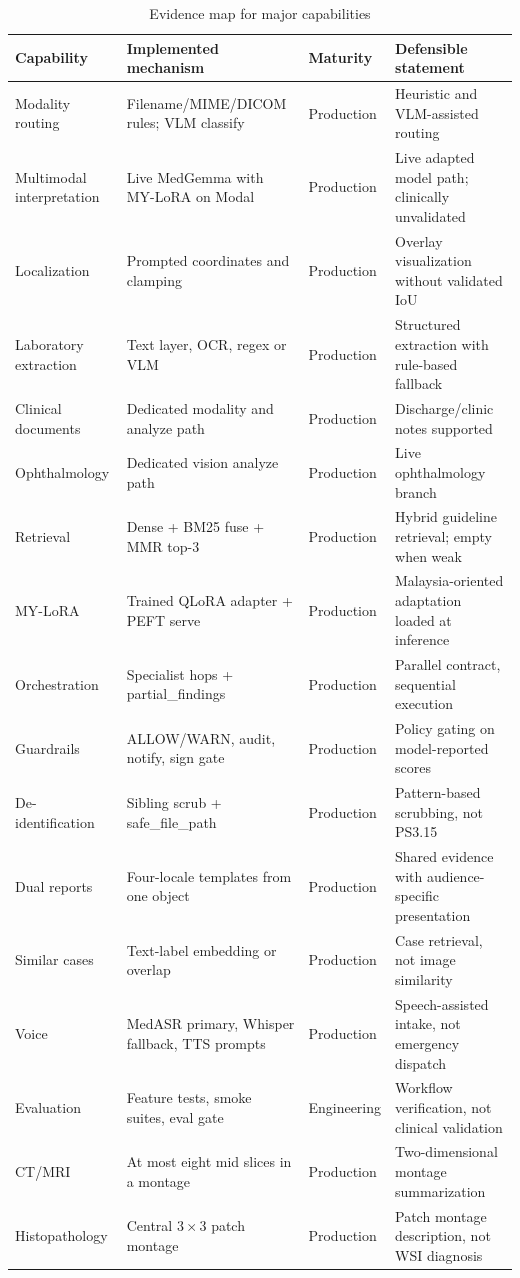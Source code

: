 \documentclass[conference]{IEEEtran}
\begin{document}
\begin{table}[t]
\caption{Evidence map for major capabilities}
\label{tab:maturity}
\centering
\scriptsize
\begin{tabular}{p{}p{}p{}p{}}
\toprule
Capability & Implemented mechanism & Maturity & Defensible statement \\
\midrule
Modality routing & Filename/MIME/DICOM rules; VLM classify & Production & Heuristic and VLM-assisted routing \\
Multimodal interpretation & Live MedGemma with MY-LoRA on Modal & Production & Live adapted model path; clinically unvalidated \\
Localization & Prompted coordinates and clamping & Production & Overlay visualization without validated IoU \\
Laboratory extraction & Text layer, OCR, regex or VLM & Production & Structured extraction with rule-based fallback \\
Clinical documents & Dedicated modality and analyze path & Production & Discharge/clinic notes supported \\
Ophthalmology & Dedicated vision analyze path & Production & Live ophthalmology branch \\
Retrieval & Dense + BM25 fuse + MMR top-3 & Production & Hybrid guideline retrieval; empty when weak \\
MY-LoRA & Trained QLoRA adapter + PEFT serve & Production & Malaysia-oriented adaptation loaded at inference \\
Orchestration & Specialist hops + partial\_findings & Production & Parallel contract, sequential execution \\
Guardrails & ALLOW/WARN, audit, notify, sign gate & Production & Policy gating on model-reported scores \\
De-identification & Sibling scrub + safe\_file\_path & Production & Pattern-based scrubbing, not PS3.15 \\
Dual reports & Four-locale templates from one object & Production & Shared evidence with audience-specific presentation \\
Similar cases & Text-label embedding or overlap & Production & Case retrieval, not image similarity \\
Voice & MedASR primary, Whisper fallback, TTS prompts & Production & Speech-assisted intake, not emergency dispatch \\
Evaluation & Feature tests, smoke suites, eval gate & Engineering & Workflow verification, not clinical validation \\
CT/MRI & At most eight mid slices in a montage & Production & Two-dimensional montage summarization \\
Histopathology & Central \(3\times3\) patch montage & Production & Patch montage description, not WSI diagnosis \\
\bottomrule
\end{tabular}
\end{table}
\end{document}
